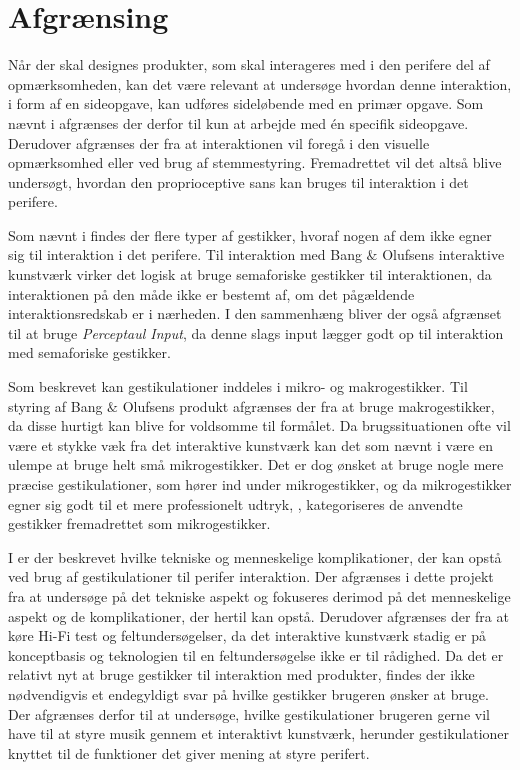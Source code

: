 \section{Afgrænsing}
\label{Afgraensning}
%
Når der skal designes produkter, som skal interageres med i den perifere del af opmærksomheden, kan det være relevant at undersøge hvordan denne interaktion, i form af en sideopgave, kan udføres sideløbende med en primær opgave. Som nævnt i  afgrænses der derfor til kun at arbejde med én specifik sideopgave. Derudover afgrænses der fra at interaktionen vil foregå i den visuelle opmærksomhed eller ved brug af stemmestyring. Fremadrettet vil det altså blive undersøgt, hvordan den proprioceptive sans kan bruges til interaktion i det perifere. 

Som nævnt i  findes der flere typer af gestikker, hvoraf nogen af dem ikke egner sig til interaktion i det perifere. Til interaktion med Bang $\&$ Olufsens interaktive kunstværk virker det logisk at bruge semaforiske gestikker til interaktionen, da interaktionen på den måde ikke er bestemt af, om det pågældende interaktionsredskab er i nærheden. I den sammenhæng bliver der også afgrænset til at bruge \textit{Perceptaul Input}, da denne slags input lægger godt op til interaktion med semaforiske gestikker.

Som beskrevet kan gestikulationer inddeles i mikro- og makrogestikker. Til styring af Bang $\&$ Olufsens produkt afgrænses der fra at bruge makrogestikker, da disse hurtigt kan blive for voldsomme til formålet. Da brugssituationen ofte vil være et stykke væk fra det interaktive kunstværk kan det som nævnt i  være en ulempe at bruge helt små mikrogestikker. Det er dog ønsket at bruge nogle mere præcise gestikulationer, som hører ind under mikrogestikker, og da mikrogestikker egner sig godt til et mere professionelt udtryk, \parencite[s. 10]{PDF:UsabilityofMicroVsMacroGestures}, kategoriseres de anvendte gestikker fremadrettet som mikrogestikker. 

I  er der beskrevet hvilke tekniske og menneskelige komplikationer, der kan opstå ved brug af gestikulationer til perifer interaktion. Der afgrænses i dette projekt fra at undersøge på det tekniske aspekt og fokuseres derimod på det menneskelige aspekt og de komplikationer, der hertil kan opstå. Derudover afgrænses der fra at køre Hi-Fi test og feltundersøgelser, da det interaktive kunstværk stadig er på konceptbasis og teknologien til en feltundersøgelse ikke er til rådighed. Da det er relativt nyt at bruge gestikker til interaktion med produkter, findes der ikke nødvendigvis et endegyldigt svar på hvilke gestikker brugeren ønsker at bruge. Der afgrænses derfor til at undersøge, hvilke gestikulationer brugeren gerne vil have til at styre musik gennem et interaktivt kunstværk, herunder gestikulationer knyttet til de funktioner det giver mening at styre perifert. 


